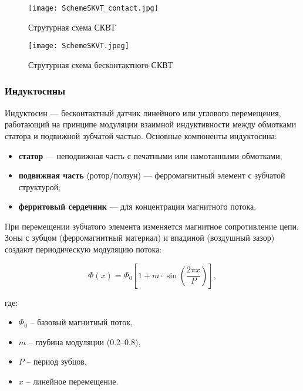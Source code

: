   \begin{figure}[htbp]
    \centering
    \begin{minipage}{0.48\linewidth}%
         \centering
          \texttt{[image: SchemeSKVT\_contact.jpg]}
          \caption{Струтурная схема СКВТ}
          \label{SchemeSKVT_Contact}
    \end{minipage}\hfill%
    \begin{minipage}{0.48\linewidth}%
        \centering
        \texttt{[image: SchemeSKVT.jpeg]}
        \caption{Струтурная схема бесконтактного СКВТ}
        \label{SchemeSKVT}
    \end{minipage}
\end{figure}

\subsubsection{Индуктосины}

Индуктосин — бесконтактный датчик линейного или углового перемещения, работающий на принципе модуляции взаимной индуктивности между обмотками статора 
и подвижной зубчатой частью. 
Основные компоненты индуктосина:
\begin{itemize}
    \item \textbf{статор} — неподвижная часть с печатными или намотанными обмотками;
    \item \textbf{подвижная часть} (ротор/ползун) — ферромагнитный элемент с зубчатой структурой;
    \item \textbf{ферритовый сердечник} — для концентрации магнитного потока.
\end{itemize}


При перемещении зубчатого элемента изменяется магнитное сопротивление цепи. Зоны с зубцом (ферромагнитный материал) и впадиной (воздушный зазор) создают 
периодическую модуляцию потока:

\begin{equation}
    \Phi(x) = \Phi_0 \left[ 1 + m \cdot \sin\left(\frac{2\pi x}{P}\right) \right],
\end{equation}

где:
\begin{itemize}
    \item $\Phi_0$ -- базовый магнитный поток,
    \item $m$ -- глубина модуляции (0.2–0.8),
    \item $P$ -- период зубцов,
    \item $x$ -- линейное перемещение.
\end{itemize}

